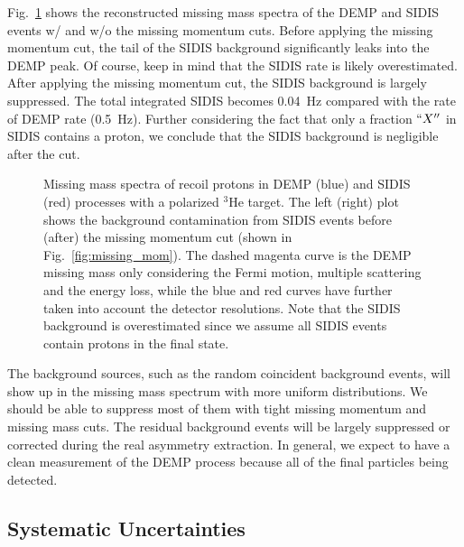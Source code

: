 Fig.~\ref{fig:missing_mass} shows the reconstructed missing mass spectra of the
DEMP and SIDIS events w/ and w/o the missing momentum cuts. Before applying the
missing momentum cut, the tail of the SIDIS background significantly leaks into
the DEMP peak. Of course, keep in mind that the SIDIS rate is likely
overestimated.  After applying the missing momentum cut, the SIDIS background
is largely suppressed.  The total integrated SIDIS becomes 0.04~Hz compared
with the rate of DEMP rate (0.5~Hz).  Further considering the fact that only a
fraction $``X''$ in SIDIS contains a proton, we conclude that the SIDIS
background is negligible after the cut.
\begin{figure}[!ht]
 \begin{center}
   \caption[Missing Mass]{\footnotesize{Missing mass spectra of recoil protons
       in DEMP (blue) and SIDIS (red) processes with a polarized $^{3}$He
       target. The left (right) plot shows the background contamination from
       SIDIS events before (after) the missing momentum cut (shown in
       Fig.~\ref{fig:missing_mom}).  The dashed magenta curve is the DEMP
       missing mass only considering the Fermi motion, multiple scattering and
       the energy loss, while the blue and red curves have further taken into
       account the detector resolutions. Note that the SIDIS background is
       overestimated since we assume all SIDIS events contain protons in the
       final state.}}
  \label{fig:missing_mass}
  \end{center}
\end{figure}

The background sources, such as the random coincident background events, will
show up in the missing mass spectrum with more uniform distributions. We should
be able to suppress most of them with tight missing momentum and missing mass
cuts.  The residual background events will be largely suppressed or corrected
during the real asymmetry extraction. In general, we expect to have a clean
measurement of the DEMP process because all of the final particles being
detected.

\subsection{Systematic Uncertainties}

